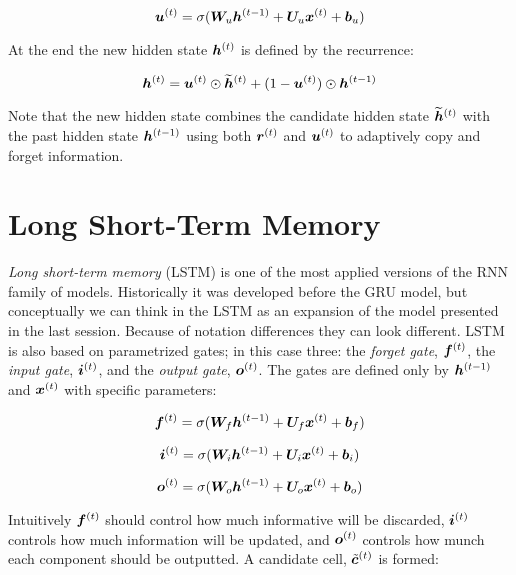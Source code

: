 \begin{equation}
\bm{u}^{(t)} = \sigma(\bm{W}_{u} \bm{h}^{(t-1)} + \bm{U}_{u} \bm{x}^{(t)} + \bm{b}_{u})
\end{equation}

At the end the new hidden state $\bm{h}^{(t)}$ is defined by the recurrence:

\begin{equation}
\bm{h}^{(t)} = \bm{u}^{(t)} \odot \bm{\widetilde{h}}^{(t)} + (1 - \bm{u}^{(t)}) \odot \bm{h}^{(t-1)} 
\end{equation}

Note that the new hidden state combines the candidate hidden state $\bm{\widetilde{h}}^{(t)}$ with the past hidden state $\bm{h}^{(t-1)}$ using both $\bm{r}^{(t)}$ and $\bm{u}^{(t)}$ to adaptively copy and forget information.

\section{Long Short-Term Memory}
\label{sec:LSTM}

\textit{Long short-term memory} (LSTM) is one of the most applied versions of the RNN family of models. Historically it was developed before the GRU model, but conceptually we can think in the LSTM as an expansion of the model presented in the last session. Because of notation differences they can look different. LSTM is also based on parametrized gates; in this case three: the \textit{forget gate}, $\bm{f}^{(t)}$, the \textit{input gate}, $\bm{i}^{(t)}$, and the \textit{output gate}, $\bm{o}^{(t)}$. The gates are defined only by $\bm{h}^{(t-1)}$ and $\bm{x}^{(t)}$ with specific parameters:


\begin{equation}
\bm{f}^{(t)} = \sigma(\bm{W}_{f} \bm{h}^{(t-1)} + \bm{U}_{f} \bm{x}^{(t)} + \bm{b}_{f})
\end{equation}

\begin{equation}
\bm{i}^{(t)} = \sigma(\bm{W}_{i} \bm{h}^{(t-1)} + \bm{U}_{i} \bm{x}^{(t)} + \bm{b}_{i})
\end{equation}

\begin{equation}
\bm{o}^{(t)} = \sigma(\bm{W}_{o} \bm{h}^{(t-1)} + \bm{U}_{o} \bm{x}^{(t)} + \bm{b}_{o})
\end{equation}

Intuitively $\bm{f}^{(t)}$ should control how much informative will be discarded, $\bm{i}^{(t)}$ controls how much information will be updated, and $\bm{o}^{(t)}$ controls how munch each component should be outputted. A candidate cell, $\tilde{\bm{c}}^{(t)}$ is formed:


